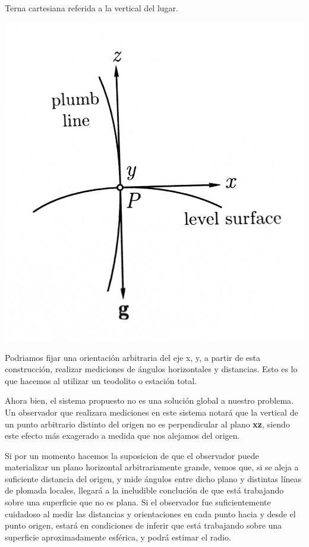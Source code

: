\documentclass{tufte-book}
\begin{document}
\begin{marginfigure}
  \label{fig:plomadayhorizonte}
  \caption{Terna cartesiana referida a la vertical del lugar.}
  \includegraphics{./imgs/PlomadaHorizonte.jpg}
\end{marginfigure}

Podriamos fijar una orientación arbitraria del eje x, y, a partir de esta construcción, realizar
mediciones de ángulos horizontales y distancias. Esto es lo que hacemos al utilizar un teodolito
o estación total.

Ahora bien, el sistema propuesto no es una solución global a nuestro problema. Un observador que
realizara mediciones en este sistema notará que la vertical de un punto arbitrario distinto del
origen no es perpendicular al plano \textbf{xz}, siendo este efecto más exagerado a medida que
nos alejamos del origen.

Si por un momento hacemos la suposicion de que el observador puede materializar un plano horizontal
arbitrariamente grande, vemos que, si se aleja a suficiente distancia del origen, y mide ángulos
entre dicho plano y distintas líneas de plomada locales, llegará a la ineludible conclución de que
está trabajando sobre una superficie que no es plana. Si el observador fue suficientemente cuidadoso
al medir las distancias y orientaciones en cada punto hacia y desde el punto origen, estará en condiciones
de inferir que está trabajando sobre una superficie aproximadamente esférica, y podrá estimar el radio.
\end{document}
